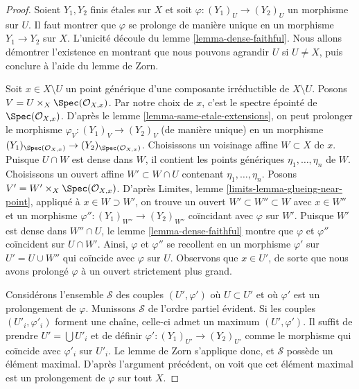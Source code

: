 \begin{proof}
Soient $Y_1, Y_2$ finis étales sur $X$ et soit
$\varphi : (Y_1)_U \to (Y_2)_U$ un morphisme sur $U$. Il faut montrer que
$\varphi$ se prolonge de manière unique en un morphisme $Y_1 \to Y_2$ sur $X$.
L'unicité découle du lemme \ref{lemma-dense-faithful}.
Nous allons démontrer l'existence en montrant que nous pouvons agrandir $U$
si $U \not = X$, puis conclure à l'aide du lemme de Zorn.

\medskip\noindent
Soit $x \in X \setminus U$ un point générique d'une composante irréductible
de $X \setminus U$. Posons $V = U \times_X \Spec(\mathcal{O}_{X, x})$.
Par notre choix de $x$, c'est le spectre épointé de
$\Spec(\mathcal{O}_{X, x})$. D'après le
lemme \ref{lemma-same-etale-extensions},
on peut prolonger le morphisme $\varphi_V : (Y_1)_V \to (Y_2)_V$
(de manière unique) en un morphisme
$(Y_1)_{\Spec(\mathcal{O}_{X, x})} \to (Y_2)_{\Spec(\mathcal{O}_{X, x})}$.
Choisissons un voisinage affine $W \subset X$ de $x$.
Puisque $U \cap W$ est dense dans $W$, il contient les points génériques
$\eta_1, \ldots, \eta_n$ de $W$. Choisissons un ouvert affine
$W' \subset W \cap U$ contenant $\eta_1, \ldots, \eta_n$.
Posons $V' = W' \times_X \Spec(\mathcal{O}_{X, x})$.
D'après Limites, lemme \ref{limits-lemma-glueing-near-point},
appliqué à $x \in W \supset W'$,
on trouve un ouvert $W' \subset W'' \subset W$ avec $x \in W''$
et un morphisme $\varphi'' : (Y_1)_{W''} \to (Y_2)_{W''}$
coïncidant avec $\varphi$ sur $W'$. Puisque $W'$ est dense dans
$W'' \cap U$, le lemme \ref{lemma-dense-faithful} montre
que $\varphi$ et $\varphi''$ coïncident sur $U \cap W'$.
Ainsi, $\varphi$ et $\varphi''$ se recollent en un morphisme
$\varphi'$ sur $U' = U \cup W''$ qui coïncide avec $\varphi$ sur $U$.
Observons que $x \in U'$, de sorte que nous avons prolongé $\varphi$
à un ouvert strictement plus grand.

\medskip\noindent
Considérons l'ensemble $\mathcal{S}$ des couples $(U', \varphi')$ où $U \subset U'$
et où $\varphi'$ est un prolongement de $\varphi$. Munissons $\mathcal{S}$
de l'ordre partiel évident. Si les couples $(U'_i, \varphi'_i)$
forment une chaîne, celle-ci admet un maximum $(U', \varphi')$.
Il suffit de prendre $U' = \bigcup U'_i$ et de définir
$\varphi' : (Y_1)_{U'} \to (Y_2)_{U'}$ comme le morphisme
qui coïncide avec $\varphi'_i$ sur $U'_i$. Le lemme de Zorn s'applique donc,
et $\mathcal{S}$ possède un élément maximal. D'après l'argument précédent,
on voit que cet élément maximal est un prolongement de $\varphi$
sur tout $X$.
\end{proof}

